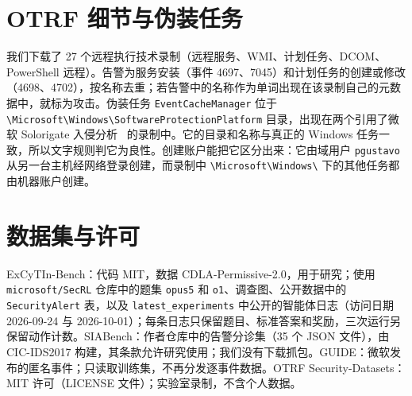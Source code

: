 \section{OTRF 细节与伪装任务}
\label{app:otrf}

我们下载了 27 个远程执行技术录制（远程服务、WMI、计划任务、DCOM、PowerShell 远程）。告警为服务安装（事件 4697、7045）和计划任务的创建或修改（4698、4702），按名称去重；若告警中的名称作为单词出现在该录制自己的元数据中，就标为攻击。伪装任务 \texttt{EventCacheManager} 位于 \texttt{\textbackslash Microsoft\textbackslash Windows\textbackslash Software\-Protection\-Platform} 目录，出现在两个引用了微软 Solorigate 入侵分析~\citep{solorigate} 的录制中。它的目录和名称与真正的 Windows 任务一致，所以文字规则判它为良性。创建账户能把它区分出来：它由域用户 \texttt{pgustavo} 从另一台主机经网络登录创建，而录制中 \texttt{\textbackslash Microsoft\textbackslash Windows\textbackslash} 下的其他任务都由机器账户创建。

\section{数据集与许可}
\label{app:licences}

ExCyTIn-Bench：代码 MIT，数据 CDLA-Permissive-2.0，用于研究；使用 \texttt{microsoft/SecRL} 仓库中的题集 \texttt{opus5} 和 \texttt{o1}、调查图、公开数据中的 \texttt{SecurityAlert} 表，以及 \texttt{latest\_experiments} 中公开的智能体日志（访问日期 2026-09-24 与 2026-10-01）；每条日志只保留题目、标准答案和奖励，三次运行另保留动作计数。SIABench：作者仓库中的告警分诊集（35 个 JSON 文件），由 CIC-IDS2017 构建，其条款允许研究使用；我们没有下载抓包。GUIDE：微软发布的匿名事件；只读取训练集，不再分发逐事件数据。OTRF Security-Datasets：MIT 许可（LICENSE 文件）；实验室录制，不含个人数据。

